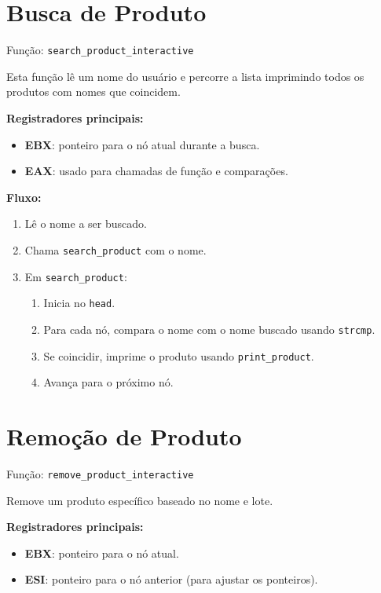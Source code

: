 \documentclass[12pt]{article}
\begin{document}
\section{Busca de Produto}
Função: \texttt{search\_product\_interactive}

Esta função lê um nome do usuário e percorre a lista imprimindo todos os produtos com nomes que coincidem.

\textbf{Registradores principais:}
\begin{itemize}
    \item \textbf{EBX}: ponteiro para o nó atual durante a busca.
    \item \textbf{EAX}: usado para chamadas de função e comparações.
\end{itemize}

\textbf{Fluxo:}
\begin{enumerate}
    \item Lê o nome a ser buscado.
    \item Chama \texttt{search\_product} com o nome.
    \item Em \texttt{search\_product}:
        \begin{enumerate}
            \item Inicia no \texttt{head}.
            \item Para cada nó, compara o nome com o nome buscado usando \texttt{strcmp}.
            \item Se coincidir, imprime o produto usando \texttt{print\_product}.
            \item Avança para o próximo nó.
        \end{enumerate}
\end{enumerate}


\section{Remoção de Produto}
Função: \texttt{remove\_product\_interactive}

Remove um produto específico baseado no nome e lote.

\textbf{Registradores principais:}
\begin{itemize}
    \item \textbf{EBX}: ponteiro para o nó atual.
    \item \textbf{ESI}: ponteiro para o nó anterior (para ajustar os ponteiros).
\end{itemize}
\end{document}
